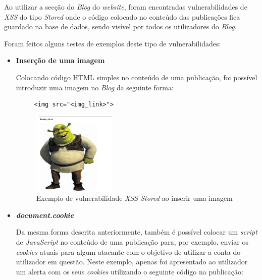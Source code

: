 \documentclass[10pt,english]{article}
\begin{document}
\par Ao utilizar a secção do \textit{Blog} do \textit{website}, foram encontradas vulnerabilidades de \textit{XSS} do tipo \textit{Stored} onde o código colocado no conteúdo das publicações fica guardado na base de dados, sendo visível por todos os utilizadores do \textit{Blog}.
\clearpage
\par Foram feitos alguns testes de exemplos deste tipo de vulnerabilidades:
\begin{itemize}
    \item \textbf{Inserção de uma imagem}
    \par Colocando código HTML simples no conteúdo de uma publicação, foi possível introduzir uma imagem no \textit{Blog} da seguinte forma:
    
    \begin{lstlisting}
     <img src="<img_link>">
    \end{lstlisting}
    
    \begin{figure}[!h]
        \centering
        \includegraphics[width=150]{images/shrek.png}
        \caption{Exemplo de vulnerabilidade \textit{XSS Stored} ao inserir uma imagem}
    \end{figure}
    

    
    \item \textbf{\textit{document.cookie}}
    \par Da mesma forma descrita anteriormente, também é possível colocar um \textit{script} de \textit{JavaScript} no conteúdo de uma publicação para, por exemplo, enviar os \textit{cookies} atuais para algum atacante com o objetivo de utilizar a conta do utilizador em questão. Neste exemplo, apenas foi apresentado ao utilizador um alerta com os seus \textit{cookies} utilizando o seguinte código na publicação:
    

\end{itemize}
\end{document}
